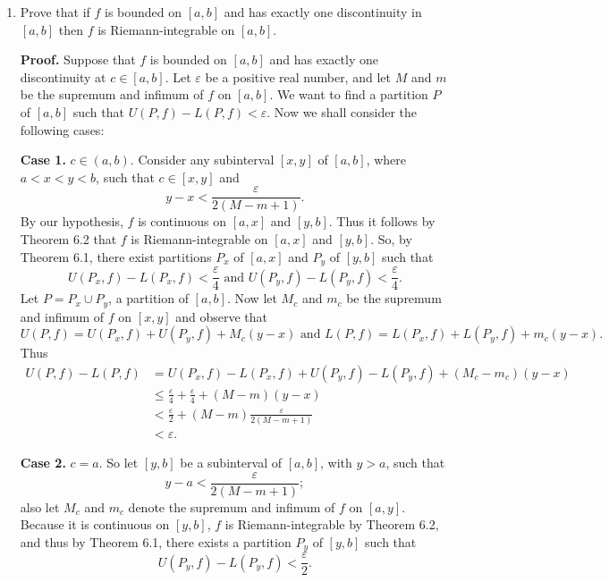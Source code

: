 \documentclass[9pt]{article}
\begin{document}
\begin{enumerate}
   \item Prove that if $f$ is bounded on $[a, b]$ and has exactly one
         discontinuity in $[a, b]$ then $f$ is Riemann-integrable on $[a, b]$.

      \textbf{Proof.} Suppose that $f$ is bounded on $[a, b]$ and has exactly
      one discontinuity at $c \in [a, b]$. Let $\varepsilon$ be a positive real
      number, and let $M$ and $m$ be the supremum and infimum of $f$ on
      $[a, b]$. We want to find a partition $P$ of $[a, b]$ such that
      $U(P, f) - L(P, f) < \varepsilon$. Now we shall consider the following
      cases:
      
      \textbf{Case 1.} $c \in (a, b)$. Consider any subinterval $[x, y]$ of
      $[a, b]$, where $a < x < y < b$, such that $c \in [x, y]$ and
      $$y - x < \frac{\varepsilon}{2(M-m+1)}.$$
      By our hypothesis, $f$ is continuous on $[a, x]$ and $[y, b]$. Thus it follows
      by Theorem 6.2 that $f$ is Riemann-integrable on $[a, x]$ and $[y, b]$.
      So, by Theorem 6.1, there exist partitions $P_x$ of $[a, x]$ and $P_y$ of
      $[y, b]$ such that
      $$U(P_x, f) - L(P_x, f) < \frac{\varepsilon}{4} \text{ and }
        U(P_y, f) - L(P_y, f) < \frac{\varepsilon}{4}.$$
      Let $P = P_x \cup P_y$, a partition of $[a, b]$. Now let $M_c$ and $m_c$
      be the supremum and infimum of $f$ on $[x, y]$ and observe that
      $$U(P, f) = U(P_x, f) + U(P_y, f) + M_c(y - x) \text{ and }
        L(P, f) = L(P_x, f) + L(P_y, f) + m_c(y - x).$$
      Thus
      \begin{align*}
         U(P, f) - L(P, f) &= U(P_x, f) - L(P_x, f) + U(P_y, f) - L(P_y, f) +
          (M_c - m_c)(y - x) \\
          &\le \frac{\varepsilon}{4} + \frac{\varepsilon}{4} + (M - m)(y - x) \\
          &<\frac{\varepsilon}{2} + (M - m)\frac{\varepsilon}{2(M-m+1)} \\
          &< \varepsilon.
      \end{align*}
      
      \textbf{Case 2.} $c = a$. So let $[y, b]$ be a subinterval of $[a, b]$,
      with $y > a$, such that
      $$y - a < \frac{\varepsilon}{2(M-m+1)};$$
      also let $M_c$ and $m_c$ denote the supremum and infimum of $f$ on
      $[a, y]$. Because it is continuous on $[y, b]$, $f$ is Riemann-integrable by Theorem
      6.2, and thus by Theorem 6.1, there exists a partition $P_y$ of $[y, b]$
      such that $$U(P_y, f) - L(P_y, f) < \frac{\varepsilon}{2}.$$
      

\end{enumerate}
\end{document}
